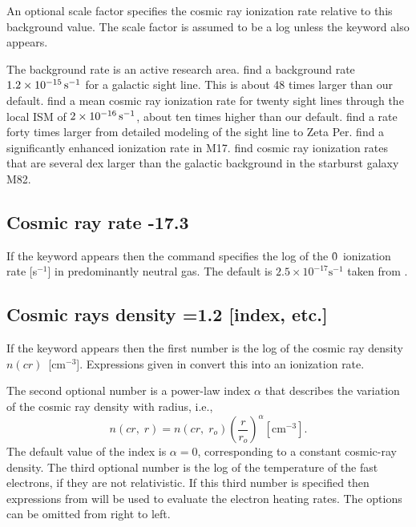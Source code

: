 An optional scale factor specifies the cosmic ray ionization rate
relative to this background value.
The scale factor is assumed to be a
log unless the keyword  also appears.

The background rate is an active research area.
\citet{McCall2003} find a background rate
$1.2 \times 10^{-15} {\rm\thinspace s^{-1}}$ for a galactic
sight line.
This is about 48 times larger than our default.
\citet{Indriolo2007} find a mean cosmic ray ionization rate for twenty sight lines
through the local ISM of $2\times 10^{-16} {\rm\thinspace s^{-1}}$,
about ten times higher than our
default.
\citet{Shaw2008} find a rate forty times larger from detailed
modeling of the sight line to Zeta Per.
\citet{Pellegrini2007} find a significantly enhanced ionization rate in M17.
\citet{Suchkov1993} find cosmic ray ionization rates that are
several dex larger than the galactic background in the starburst galaxy M82. 

\subsection{Cosmic ray rate -17.3}

If the keyword  appears then the command specifies
the log of the
\h0\ ionization rate [s$^{-1}$] in predominantly neutral gas.
The default is
$2.5\times 10^{-17} \mathrm{s}^{-1}$ taken from \citet{Williams1998}.

\subsection{Cosmic rays density =1.2 [index, etc.]}

If the keyword  appears then the first number
is the log of the
cosmic ray density $n(cr)$~[cm$^{-3}$].
Expressions given in \citet{FerlandMushotzky1984} convert this into an ionization rate.

The second optional number is a power-law index $\alpha $ that
describes the
variation of the cosmic ray density with radius, i.e.,
\begin{equation}
n\left( {cr,\;r} \right) = n\left( {cr,\;r_o } \right)\left( {\frac{r}{{r_o
}}} \right)^\alpha
 [\mathrm{cm}^{-3}]  .
\end{equation}
The default value of the index is  $\alpha =0$,
corresponding to a constant cosmic-ray density.
The third optional number is the log of the temperature of
the fast electrons, if they are not relativistic.
If this third number
is specified then expressions from \citet{Balbus1982} will be used
to evaluate the electron heating rates.
The options can be omitted from right to left.

